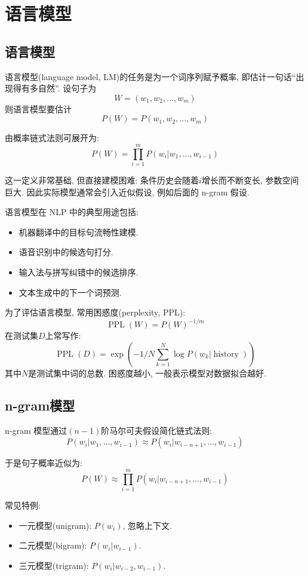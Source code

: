 \chapter{语言模型}


\section{语言模型}


语言模型(language model, LM)的任务是为一个词序列赋予概率, 即估计一句话“出现得有多自然”.
设句子为
\[
W = (w_1, w_2, \dots, w_m)
\]
则语言模型要估计
\[
P(W) = P(w_1, w_2, \dots, w_m)
\]

由概率链式法则可展开为:
\[
P(W) = \prod_{i=1}^m P(w_i | w_1, \dots, w_{i-1})
\]

这一定义非常基础, 但直接建模困难: 条件历史会随着$i$增长而不断变长, 参数空间巨大.
因此实际模型通常会引入近似假设, 例如后面的 n-gram 假设.

语言模型在 NLP 中的典型用途包括:

\begin{itemize}
\item 机器翻译中的目标句流畅性建模.
\item 语音识别中的候选句打分.
\item 输入法与拼写纠错中的候选排序.
\item 文本生成中的下一个词预测.
\end{itemize}

为了评估语言模型, 常用困惑度(perplexity, PPL):
\[
\operatorname{PPL}(W) = P(W)^{-1/m}
\]
在测试集$D$上常写作:
\[
\operatorname{PPL}(D)
  = \exp(
      - 1/N \sum_{k=1}^N \log P(w_k | \operatorname{history})
    )
\]
其中$N$是测试集中词的总数. 困惑度越小, 一般表示模型对数据拟合越好.

\section{n-gram模型}


n-gram 模型通过$(n-1)$阶马尔可夫假设简化链式法则:
\[
P(w_i | w_1, \dots, w_{i-1})
  \approx
  P(w_i | w_{i-n+1}, \dots, w_{i-1})
\]

于是句子概率近似为:
\[
P(W) \approx \prod_{i=1}^m P(w_i | w_{i-n+1}, \dots, w_{i-1})
\]

常见特例:

\begin{itemize}
\item 一元模型(unigram): $P(w_i)$, 忽略上下文.
\item 二元模型(bigram): $P(w_i|w_{i-1})$.
\item 三元模型(trigram): $P(w_i|w_{i-2},w_{i-1})$.
\end{itemize}

